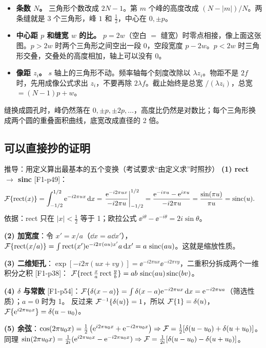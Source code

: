\begin{idea}
\begin{itemize}
\item \textbf{条数 $N$。} 三角形个数改成 $2N-1$。第 $m$ 个峰的高度改成 $(N-|m|)/N$。两条缝就是 3 个三角形，峰 $1$ 和 $\frac12$，中心在 $0,\pm p$。
\item \textbf{中心距 $p$ 和缝宽 $w$ 的比。} $p=2w$（空白 $=$ 缝宽）时零点相接，像上面这张图。$p>2w$ 时两个三角形之间空出一段 0，空段宽度 $p-2w$。$p<2w$ 时三角形交叠，交叠处的高度相加，轴上可以没有 0。
\item \textbf{像距 $z_i$。} $s$ 轴上的三角形不动。频率轴每个刻度改除以 $\lambda z_i$。物距不是 $2f$ 时，先用成像公式求出 $z_i$，不要再除 $2\lambda f$。截止始终是总宽 $/(\lambda z_i)$，总宽 $=(N-1)p+w$。
\end{itemize}
缝换成圆孔时，峰仍然落在 $0,\pm p,\pm 2p,\dots$，高度比仍然是对数比；每个三角形换成两个圆的重叠面积曲线，底宽改成直径的 2 倍。
\end{idea}

\subsection{可以直接抄的证明}\label{sec:ftproofs}

\begin{exam}{推导：用定义算出最基本的五个变换（考试要求“由定义求”时照抄）}
\textbf{(1) rect $\to$ sinc} [F1-p49]：
\begin{align*}
\mathcal{F}\{\operatorname{rect}(x)\}&=\int_{-1/2}^{1/2}\mathrm{e}^{-i2\pi ux}\,\mathrm{d} x
=\left.\frac{\mathrm{e}^{-i2\pi ux}}{-i2\pi u}\right|_{-1/2}^{1/2}
=\frac{\mathrm{e}^{-i\pi u}-\mathrm{e}^{i\pi u}}{-i2\pi u}
=\frac{\sin(\pi u)}{\pi u}=\operatorname{sinc}(u).
\end{align*}
依据：rect 只在 $|x|<\frac12$ 等于 1；欧拉公式 $\ee^{i\theta}-\ee^{-i\theta}=2i\sin\theta$。

\textbf{(2) 加宽度}：令 $x'=x/a$（$\dd x=a\dd x'$），
$\mathcal{F}\{\operatorname{rect}(x/a)\}=\int\operatorname{rect}(x')\mathrm{e}^{-i2\pi(au)x'}a\,\mathrm{d} x'=a\,\operatorname{sinc}(au)$。这就是缩放性质。

\textbf{(3) 二维矩孔}：$\exp[-i2\pi(ux+vy)]=\ee^{-i2\pi ux}\ee^{-i2\pi vy}$，二重积分拆成两个一维积分之积 [F1-p38]：
$\mathcal{F}\{\operatorname{rect}\frac xa\operatorname{rect}\frac yb\}=ab\,\operatorname{sinc}(au)\operatorname{sinc}(bv)$。

\textbf{(4) $\delta$ 与常数} [F1-p54]：$\mathcal{F}\{\delta(x-a)\}=\int\delta(x-a)\mathrm{e}^{-i2\pi ux}\,\mathrm{d} x=\mathrm{e}^{-i2\pi ua}$（筛选性质）；$a=0$ 时为 1。
反过来 $\mathcal{F}^{-1}\{\delta(u)\}=1$，所以 $\mathcal{F}\{1\}=\delta(u)$，$\mathcal{F}\{\mathrm{e}^{i2\pi u_0x}\}=\delta(u-u_0)$。

\textbf{(5) 余弦}：$\cos(2\pi u_0x)=\frac12\left(\mathrm{e}^{i2\pi u_0x}+\mathrm{e}^{-i2\pi u_0x}\right)\Rightarrow\mathcal{F}=\frac12[\delta(u-u_0)+\delta(u+u_0)]$。
同理 $\sin(2\pi u_0x)=\frac1{2i}(\mathrm{e}^{i2\pi u_0x}-\mathrm{e}^{-i2\pi u_0x})\Rightarrow\mathcal{F}=\frac1{2i}[\delta(u-u_0)-\delta(u+u_0)]$。
\end{exam}

